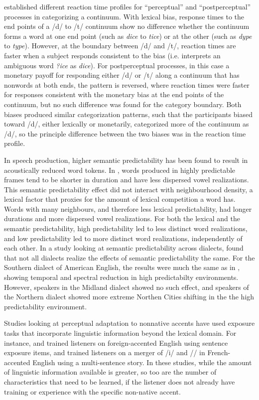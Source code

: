 \citet{Connine1987a} established different reaction time profiles for ``perceptual'' and ``postperceptual'' processes in categorizing a continuum.  With lexical bias, response times to the end points of a /d/ to /t/ continuum show no difference whether the continuum forms a word at one end point (such as \emph{dice} to \emph{tice}) or at the other (such as \emph{dype} to \emph{type}).  However, at the boundary between /d/ and /t/, reaction times are faster when a subject responds consistent to the bias (i.e. interprets an ambiguous word \emph{?ice} as \emph{dice}).  For postperceptual processes, in this case a monetary payoff for responding either /d/ or /t/ along a continuum that has nonwords at both ends, the pattern is reversed, where reaction times were faster for responses consistent with the monetary bias at the end points of the continuum, but no such difference was found for the category boundary.  Both biases produced similar categorization patterns, such that the participants biased toward /d/, either lexically or monetarily, categorized more of the continuum as /d/, so the principle difference between the two biases was in the reaction time profile.



In speech production, higher semantic predictability has been found to result in acoustically reduced word tokens.  
In \citet{Scarborough2010}, words produced in highly predictable frames tend to be shorter in duration and have less dispersed vowel realizations.  
This semantic predictability effect did not interact with neighbourhood density, a lexical factor that proxies for the amount of lexical competition a word has.  
Words with many neighbours, and therefore less lexical predictability, had longer durations and more dispersed vowel realizations.  
For both the lexical and the semantic predictability, high predictability led to less distinct word realizations, and low predictability led to more distinct word realizations, independently of each other.
In a study looking at semantic predictability across dialects, \citet{Clopper2008} found that not all dialects realize the effects of semantic predictability the same.  
For the Southern dialect of American English, the results were much the same as in \citet{Scarborough2010}, showing temporal and spectral reduction in high predictabilty environments.  
However, speakers in the Midland dialect showed no such effect, and speakers of the Northern dialect showed more extreme Northen Cities shifting in the the high predictability environment.



Studies looking at perceptual adaptation to nonnative accents have used exposure tasks that incorporate linguistic information beyond the lexical domain.  
For instance, \citet{Clarke2004} and \citet{Bradlow2008} trained listeners on foreign-accented English using sentence exposure items, and \citet{Trude2013} trained listeners on a merger of /i/ and /\textsci/ in French-accented English using a multi-sentence story.
In these studies, while the amount of linguistic information available is greater, so too are the number of characteristics that need to be learned, if the listener does not already have training or experience with the specific non-native accent.